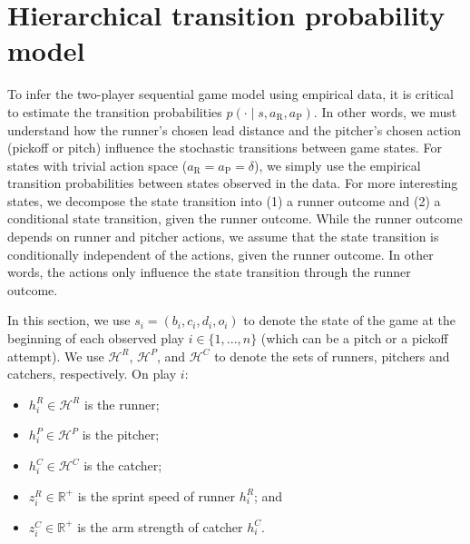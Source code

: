 \documentclass[aoas]{imsart}
\begin{document}
  \section{Hierarchical transition probability model}
  \label{sec:transition-probability-model}

    To infer the two-player sequential game model using empirical data, it is critical to estimate the transition probabilities $p(\cdot \mid s,a_\text{R},a_\text{P})$. In other words, we must understand how the runner's chosen lead distance and the pitcher's chosen action (pickoff or pitch) influence the stochastic transitions between game states. For states with trivial action space ($a_\text{R} = a_\text{P} = \delta$), we simply use the empirical transition probabilities between states observed in the data. For more interesting states, we decompose the state transition into (1) a runner outcome and (2) a conditional state transition, given the runner outcome. While the runner outcome depends on runner and pitcher actions, we assume that the state transition is conditionally independent of the actions, given the runner outcome. In other words, the actions only influence the state transition through the runner outcome.

    In this section, we use $s_i = (b_i, c_i, d_i, o_i)$ to denote the state of the game at the beginning of each observed play $i \in \{1, ..., n\}$ (which can be a pitch or a pickoff attempt). We use $\mathcal{H}^R$, $\mathcal{H}^P$, and $\mathcal{H}^C$ to denote the sets of runners, pitchers and catchers, respectively. On play $i$:
    \begin{itemize}
      \item $h_i^R \in \mathcal{H}^R$ is the runner;
      \item $h_i^P \in \mathcal{H}^P$ is the pitcher;
      \item $h_i^C \in \mathcal{H}^C$ is the catcher;
      \item $z_i^R \in \mathbb{R^+}$ is the sprint speed of runner $h_i^R$; and
      \item $z_i^C \in \mathbb{R^+}$ is the arm strength of catcher $h_i^C$.
    \end{itemize}
    
\end{document}
